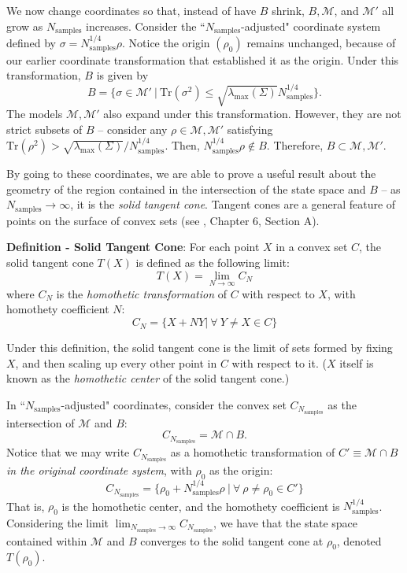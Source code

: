 \documentclass[aps,pra, twocolumn]{revtex4-1}
\newcommand{\M}{\mathcal{M}}
\begin{document}
We now change coordinates so that, instead of have $B$ shrink,  $B, \M$, and $\M'$ all grow as $N_{\mathrm{samples}}$ increases. Consider the ``$N_{\mathrm{samples}}$-adjusted" coordinate system defined by $\sigma =  N^{1/4}_{\mathrm{samples}}\rho$. Notice the origin $(\rho_{0})$ remains unchanged, because of our earlier coordinate transformation that established it as the origin. Under this transformation, $B$ is given by
\[B = \{\sigma \in \M'~|~\mathrm{Tr}(\sigma^{2}) \leq \sqrt{\lambda_{\max}(\Sigma)}N_{\mathrm{samples}}^{1/4}\}.\]
 The models $\M,\M'$ also expand under this transformation. However, they are not strict subsets of $B$ -- consider any $\rho \in \M, \M'$ satisfying $\mathrm{Tr}(\rho^{2}) > \sqrt{\lambda_{\max}(\Sigma)}/N_{\mathrm{samples}}^{1/4}$. Then, $N_{\mathrm{samples}}^{1/4}\rho \not \in B$. Therefore, $B \subset \M, \M'$.
 
 By going to these coordinates, we are able to prove a useful result about the geometry of the region contained in the intersection of the state space and $B$ --  as $N_{\mathrm{samples}} \rightarrow \infty$, it is the \emph{solid tangent cone}. Tangent cones are a general feature of points on the surface of convex sets (see \cite{Rockafellar1998}, Chapter 6, Section A).

\textbf{Definition - Solid Tangent Cone}: For each point $X$ in a convex set $C$, the solid tangent cone $T(X)$ is defined as the following limit:
\[T(X) = \lim_{N\rightarrow \infty} C_{N}\]
where $C_{N}$ is the \emph{homothetic transformation} of $C$ with respect to $X$, with homothety coefficient $N$:
\[C_{N} = \{X + NY  |~\forall ~Y \neq X \in C\}\]

Under this definition, the solid tangent cone is the limit of sets formed by fixing $X$, and then scaling up every other point in $C$ with respect to it. ($X$ itself is known as the \emph{homothetic center} of the solid tangent cone.) 

In ``$N_{\mathrm{samples}}$-adjusted" coordinates, consider the convex set  $C_{N_{\mathrm{samples}}}$ as the intersection of $\M$ and $B$:
\[C_{N_{\mathrm{samples}}} = \M \cap B.\]
Notice that we may write $C_{N_{\mathrm{samples}}}$ as a homothetic transformation of $C' \equiv \M \cap B$ \emph{in the original coordinate system}, with $\rho_{0}$ as the origin:
\[C_{N_{\mathrm{samples}}} = \{\rho_{0} + N^{1/4}_{\mathrm{samples}}\rho~|~\forall~\rho \neq \rho_{0} \in C'\}\]
That is, $\rho_{0}$ is the homothetic center, and the homothety coefficient is $N_{\mathrm{samples}}^{1/4}$.
Considering the limit $\lim_{N_{\mathrm{samples}} \rightarrow \infty} C_{N_{\mathrm{samples}}}$, we have that the state space contained within $\M$ and $B$ converges to the solid tangent cone at $\rho_{0}$, denoted $T(\rho_{0})$.
\end{document}
